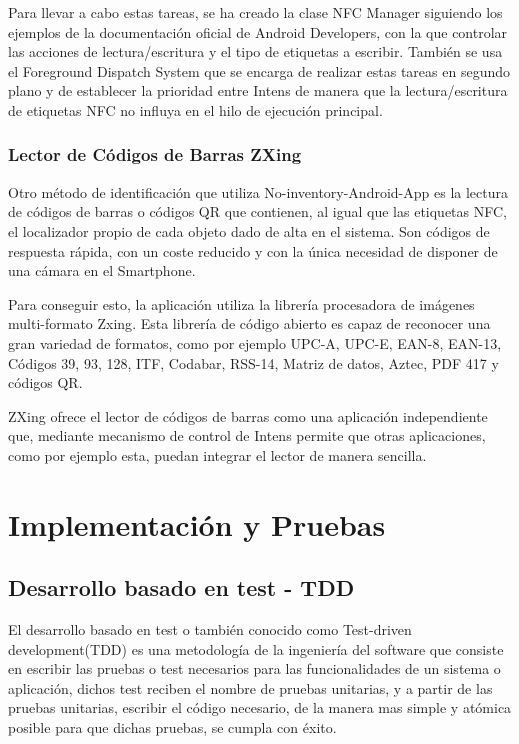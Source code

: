 \documentclass[a4paper,11pt]{book}
\begin{document}
Para llevar a cabo estas tareas, se ha creado la clase NFC Manager siguiendo los ejemplos de la documentación oficial de Android Developers\cite{nfc2}, con la que controlar las acciones de lectura/escritura y el tipo de etiquetas a escribir. También se usa el Foreground Dispatch System\cite{nfc3} que se encarga de realizar estas tareas en segundo plano  y de establecer la prioridad entre Intens de manera que la lectura/escritura de etiquetas NFC no influya en el hilo de ejecución principal. 


 

\subsection{Lector de Códigos de Barras ZXing}

Otro método de identificación que utiliza  No-inventory-Android-App es la lectura de códigos de barras o códigos QR que contienen, al igual que las etiquetas NFC, el localizador propio de cada objeto dado de alta en el sistema. Son códigos de respuesta rápida, con un coste reducido y con la única necesidad de disponer de una cámara en el Smartphone. 

Para conseguir esto, la aplicación utiliza la librería procesadora de imágenes multi-formato Zxing\cite{cebra}. Esta librería de código abierto  es capaz de reconocer una gran variedad de formatos, como por ejemplo  UPC-A, UPC-E, EAN-8, EAN-13, Códigos 39, 93, 128, ITF, Codabar, RSS-14, Matriz de datos, Aztec, PDF 417 y códigos QR. 

ZXing ofrece el lector de códigos de barras como una aplicación independiente que, mediante mecanismo de control de Intens\cite{cebra2} permite que otras aplicaciones, como por ejemplo esta,  puedan integrar el lector de manera sencilla.




\chapter{Implementación y Pruebas}


\section{Desarrollo basado en test - TDD}\label{sec:TDD}

El desarrollo basado en test o también conocido como Test-driven development\cite{tdd}(TDD) es una metodología de la ingeniería del software que consiste en escribir las pruebas o test necesarios para las funcionalidades de un sistema o aplicación, dichos test reciben el nombre de pruebas unitarias, y a partir de las pruebas unitarias, escribir el código necesario, de la manera mas simple y atómica posible para que dichas pruebas, se cumpla con éxito.  
\end{document}
